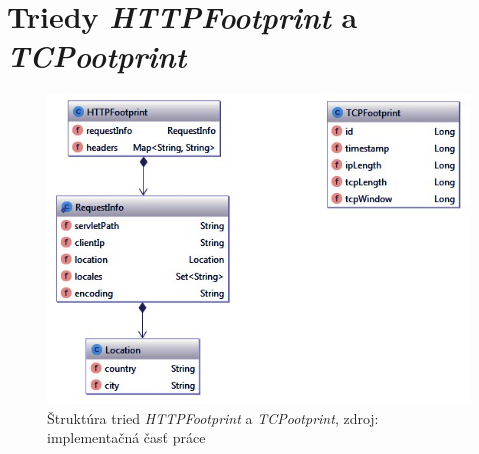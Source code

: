 \documentclass[
  digital, %
  oneside, %
  table,   %
  lof,     %
  nolot,   %
  nocover
]{fithesis3}
\begin{document}
\chapter{Triedy \textit{HTTPFootprint} a \textit{TCPootprint}}
\label{fig:appendix-structure}
\begin{figure}[h]
  \centering
    \includegraphics[width=\textwidth]{images/appendix-structure.png}
  \caption{Štruktúra tried \textit{HTTPFootprint} a \textit{TCPootprint},
  zdroj: implementačná časť práce}
\end{figure}
\end{document}
